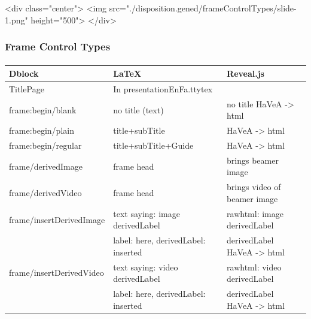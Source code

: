 \begin{whenOrg}
\begin{htmlonly}

\begin{frame}[fragile,plain,label=frameControlTypes]
    \frametitle{}
    \framesubtitle{}
    \begin{rawhtml}
<div class="center">
<img src="./disposition.gened/frameControlTypes/slide-1.png" height="500">
</div>
    \end{rawhtml}
\end{frame}
\end{htmlonly}

\begin{verblatex}

\begin{frame}[fragile,label=frameControlTypes]
    \frametitle{Frame Control Types}
    \framesubtitle{}

\small
\begin{tabular}{|p{1.5in}|p{2.08in}|p{1.75in}|}
  \hline
  \textbf{Dblock} & \textbf{LaTeX} & \textbf{Reveal.js} \\
  \hline
  TitlePage & In presentationEnFa.ttytex & \\
  \hline
  frame:begin/blank & no title (text) & no title  HaVeA -> html \\
  \hline
  frame:begin/plain & title+subTitle & HaVeA -> html \\
  \hline
  frame:begin/regular & title+subTitle+Guide & HaVeA -> html \\
  \hline
  frame/derivedImage & frame head & brings beamer image \\
  \hline
  frame/derivedVideo & frame head & brings video of beamer image \\
  \hline
  frame/insertDerivedImage & text saying: image derivedLabel & rawhtml: image derivedLabel \\
                  & label: here, derivedLabel: inserted & derivedLabel HaVeA -> html \\
  \hline
  frame/insertDerivedVideo & text saying: video derivedLabel & rawhtml: video derivedLabel \\
                  & label: here, derivedLabel: inserted & derivedLabel HaVeA -> html \\
  \hline
\end{tabular}
\normalsize



\end{frame}
\end{verblatex}
\end{whenOrg}
